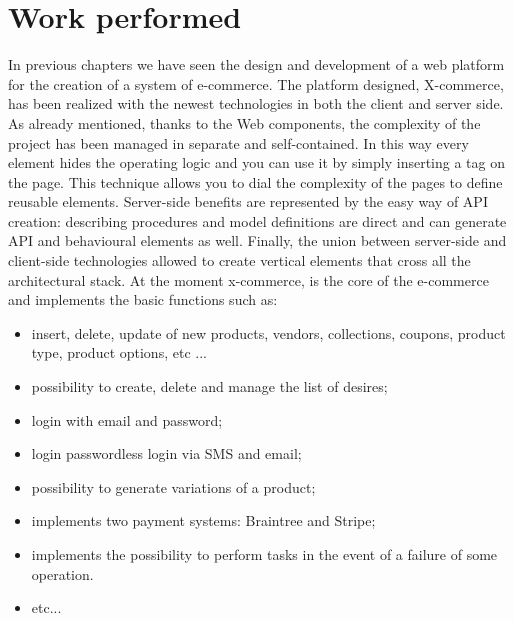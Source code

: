 \section{Work performed}
\label{sec:work_performed}
In previous chapters we have seen the design and development of a web platform for the creation of a system of e-commerce.
\newline
The platform designed, X-commerce, has been realized with the newest technologies in both the client and server side.
\newline
As already mentioned, thanks to the Web components, the complexity of the project has been managed in separate and self-contained. In this way every element hides the operating logic and you can use it by simply inserting a tag on the page. This technique allows you to dial the complexity of the pages to define reusable elements.
\newline
Server-side benefits are represented by the easy way of API creation: describing procedures and model definitions are direct and can generate API and behavioural elements as well.
Finally, the union between server-side and client-side technologies allowed
to create vertical elements that cross all the architectural stack.
At the moment x-commerce, is the core of the e-commerce and implements the basic functions such as:
\begin{itemize}
\item insert, delete, update of new products, vendors, collections, coupons, product type, product options, etc ...
\item possibility to create, delete and manage the list of desires;
\item login with email and password;
\item login passwordless login via SMS and email;
\item possibility to generate variations of a product;
\item implements two payment systems: Braintree and Stripe;
\item implements the possibility to perform tasks in the event of a failure of some operation.
\item etc...
\end{itemize}